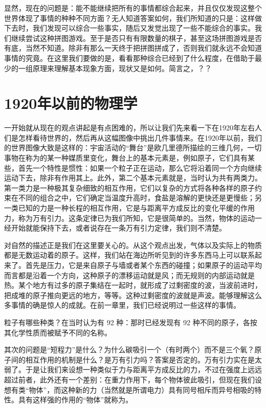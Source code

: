 显然，现在的问题是：能不能继续把所有的事情都综合起来，并且仅仅发现这整个世界体现了事情的种种不同方面？无人知道答案如何，我们所知道的只是：这样做下去时，我们发现可以综合一些事实，随后又发觉出现了一些不能综合的事实。我们继续尝试这种拼图游戏。至于是否只有有限数量的棋子，甚至这场拼图游戏是否有底，当然不知道。除非有那么一天终于把拼图拼成了，否则我们就永远不会知道事情的究竟。在这里我们要做的是，看看那种综合已经到了什么程度，在借助于最少的一组原理来理解基本现象方面，现状又是如何。简言之，？？

\section{1920年以前的物理学}

一开始就从现在的观点讲起是有点困难的，所以让我们先来看一下在1920年左右人们是怎样看待世界的，然后再从这幅图像中挑出几件事情来。在1920年以前，我们的世界图像大致是这样的：宇宙活动的“舞台”是欧几里德所描绘的三维几何，一切事物在称为的某一种媒质里变化，舞台上的基本元素是，例如原子，它们具有某些，首先一个特性是惯性：如果一个粒子正在运动，那么它将沿着同一个方向继续运动下去，除非有作用其上。此外，第二个基本元素就是，当时认为共有两类力。第一类力是一种极其复杂细致的相互作用，它们以复杂的方式将各种各样的原子约束在不同的组合之中，它们确定当温度升高时，食盐是溶解的更快还是更慢些；另一类已知的力是一种长程的相互作用，它是与距离平方成反比的变化平缓的作用力，称为万有引力。这条定律已为我们所知，它是很简单的。当然，物体的运动一经开始就能保持下去，或者说存在一条万有引力定律，我们则不清楚。

对自然的描述正是我们在这里要关心的。从这个观点出发，气体以及实际上的物质都是无数运动着的原子。这样，我们站在海边所听见到的许多东西马上可以联系起来了。首先是压力，它是来自原子与墙或者某个东西的碰撞；如果原子的运动平均而言都是沿着一个方向，这种原子的漂移运动就是风；而无规则的内部运动就是热。某个地方有过多的原子集结在一起时，就形成了过剩密度的波，当波前进时，把成堆的原子推向更远的地方，等等。这种过剩密度的波就是声波。能够理解这么多事情的确是惊人的成就。在前一章里，我们已经说明过一些这样的事情。

粒子有哪些种类？在当时认为有 92 种：那时已经发现有 92 种不同的原子，各按其化学性质而被赋予不同的名称。

其次的问题是“短程力”是什么？为什么碳吸引一个（有时两个）而不是三个氧？原子间的相互作用的机制是什么？是万有引力吗？答案是否定的。万有引力实在是太弱了。于是让我们来设想一种类似于力与距离平方成反比的力，不过在强度上远远超过前者，此外还有一个差别：在重力作用下，每个物体彼此吸引，但现在我们设想有类“物体”，而这种新的力（当然就是所谓电力）具有同号相斥而异号相吸的特性。具有这样强的作用的“物体”就称为。

